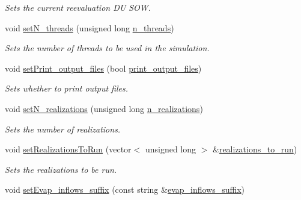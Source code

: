 \begin{DoxyCompactItemize}
\begin{DoxyCompactList}\small\item\em Sets the current reevaluation DU S\+OW. \end{DoxyCompactList}\item 
void \mbox{\hyperlink{classProblem_ac7a563c47c5a2f5217763b23b5357ecd_ac7a563c47c5a2f5217763b23b5357ecd}{set\+N\+\_\+threads}} (unsigned long \mbox{\hyperlink{classProblem_a3303a162d648e8ae16153b57b5b4054f_a3303a162d648e8ae16153b57b5b4054f}{n\+\_\+threads}})
\begin{DoxyCompactList}\small\item\em Sets the number of threads to be used in the simulation. \end{DoxyCompactList}\item 
void \mbox{\hyperlink{classProblem_a9e1298432a894cbe8d373bac24edb5cf_a9e1298432a894cbe8d373bac24edb5cf}{set\+Print\+\_\+output\+\_\+files}} (bool \mbox{\hyperlink{classProblem_a3372a73270ce989f5d2056cace66215b_a3372a73270ce989f5d2056cace66215b}{print\+\_\+output\+\_\+files}})
\begin{DoxyCompactList}\small\item\em Sets whether to print output files. \end{DoxyCompactList}\item 
void \mbox{\hyperlink{classProblem_acc30995bc20a6c09e58b7edfec870702_acc30995bc20a6c09e58b7edfec870702}{set\+N\+\_\+realizations}} (unsigned long \mbox{\hyperlink{classProblem_a270a5672643bfe09e52e0f24e1884136_a270a5672643bfe09e52e0f24e1884136}{n\+\_\+realizations}})
\begin{DoxyCompactList}\small\item\em Sets the number of realizations. \end{DoxyCompactList}\item 
void \mbox{\hyperlink{classProblem_ad810f0b105a05bcc38aec36f603a090d_ad810f0b105a05bcc38aec36f603a090d}{set\+Realizations\+To\+Run}} (vector$<$ unsigned long $>$ \&\mbox{\hyperlink{classProblem_af9ed9265d0d2b4918bd468d717429de1_af9ed9265d0d2b4918bd468d717429de1}{realizations\+\_\+to\+\_\+run}})
\begin{DoxyCompactList}\small\item\em Sets the realizations to be run. \end{DoxyCompactList}\item 
void \mbox{\hyperlink{classProblem_aa841014244a2becdc34717e440c4ce11_aa841014244a2becdc34717e440c4ce11}{set\+Evap\+\_\+inflows\+\_\+suffix}} (const string \&\mbox{\hyperlink{classProblem_a1ff3958eef8bfb851a84ce0772104dca_a1ff3958eef8bfb851a84ce0772104dca}{evap\+\_\+inflows\+\_\+suffix}})

\end{DoxyCompactItemize}
